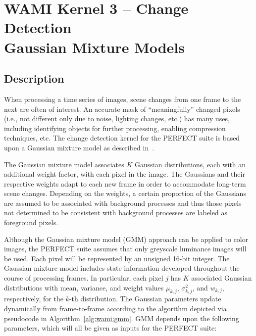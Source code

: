 \documentclass{report}
\begin{document}

\section{WAMI Kernel 3 -- Change Detection \\ Gaussian Mixture Models}

\subsection{Description}

When processing a time series of images, scene changes from one frame
to the next are often of interest.
An accurate mask of ``meaningfully'' changed pixels (i.e., not different
only due to noise, lighting changes, etc.) has many uses, including identifying
objects for further processing, enabling compression techniques, etc.
The change detection kernel for the PERFECT suite is based upon a Gaussian
mixture model as described in~\cite{Stauffer99}.

The Gaussian mixture model associates $K$ Gaussian distributions, each
with an additional weight factor, with each pixel in the image.
The Gaussians and their respective weights adapt to each new frame in
order to accommodate long-term scene changes.
Depending on the weights, a certain proportion of the Gaussians are
assumed to be associated with background processes and thus those
pixels not determined to be consistent with background processes
are labeled as foreground pixels.

Although the Gaussian mixture model (GMM) approach can be applied to color images,
the PERFECT suite assumes that only greyscale luminance images will be used.
Each pixel will be represented by an unsigned 16-bit integer.
The Gaussian mixture model includes state information developed throughout
the course of processing frames.
In particular, each pixel $j$ has $K$ associated Gaussian distributions with
mean, variance, and weight values $\mu_{k,j}$, $\sigma^2_{k,j}$, and $w_{k,j}$,
respectively, for the $k$-th distribution.
The Gaussian parameters update dynamically from frame-to-frame according
to the algorithm depicted via pseudocode in Algorithm~\ref{alg:wami:gmm}.
GMM depends upon the following parameters, which will all be given as
inputs for the PERFECT suite:
\end{document}
